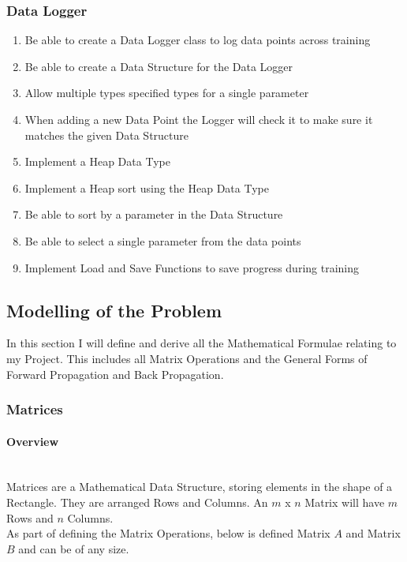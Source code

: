 \begin{flushleft}
            \subsubsection*{Data Logger}
                \begin{enumerate}
                    \item Be able to create a Data Logger class to log data points across training
                    \item Be able to create a Data Structure for the Data Logger
                    \item Allow multiple types specified types for a single parameter
                    \item When adding a new Data Point the Logger will check it to make sure it matches the given Data Structure
                    \item Implement a Heap Data Type
                    \item Implement a Heap sort using the Heap Data Type
                    \item Be able to sort by a parameter in the Data Structure
                    \item Be able to select a single parameter from the data points
                    \item Implement Load and Save Functions to save progress during training
                \end{enumerate}   

        \subsection{Modelling of the Problem}
            \large
            \vspace{0.2cm}
            In this section I will define and derive all the Mathematical Formulae relating to my Project. This includes all Matrix Operations 
            and the General Forms of Forward Propagation and Back Propagation. \\
            \vspace{0.2cm}

            \subsubsection{Matrices}
                \paragraph{Overview} \mbox{} \\
                Matrices are a Mathematical Data Structure, storing elements in the shape of a Rectangle. They are arranged Rows and Columns.
                An $m$ x $n$ Matrix will have $m$ Rows and $n$ Columns. \\
                \vspace{0.2cm}
                As part of defining the Matrix Operations, below is defined Matrix $A$ and Matrix $B$ and can be of any size. \\
                \vspace{0.5cm}


\end{flushleft}
